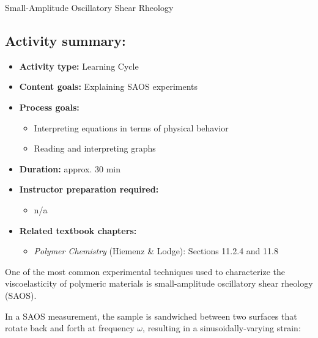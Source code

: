 \begin{activity}[extension]{Small-Amplitude Oscillatory Shear Rheology}
\begin{instructornotes}
	\subsection*{Activity summary:}
	\begin{itemize}
		\item \textbf{Activity type:} Learning Cycle
		\item \textbf{Content goals:} Explaining SAOS experiments
		\item \textbf{Process goals:} %
			\begin{itemize}
				\item Interpreting equations in terms of physical behavior
				\item Reading and interpreting graphs
			\end{itemize}
		\item \textbf{Duration:} approx. 30 min
		\item \textbf{Instructor preparation required:} 
			\begin{itemize}
				\item n/a
			\end{itemize}
		\item \textbf{Related textbook chapters:}
			\begin{itemize}
				\item \emph{Polymer Chemistry} (Hiemenz \& Lodge): Sections 11.2.4 and 11.8
			\end{itemize}
	\end{itemize}

\end{instructornotes}



\begin{model}
\label{model:rheology}

	One of the most common experimental techniques used to characterize the viscoelasticity of polymeric materials is small-amplitude oscillatory shear rheology (SAOS).
	
	In a SAOS measurement, the sample is sandwiched between two surfaces that rotate back and forth at frequency $\omega$, resulting in a sinusoidally-varying strain:
	

\end{model}
\end{activity}
